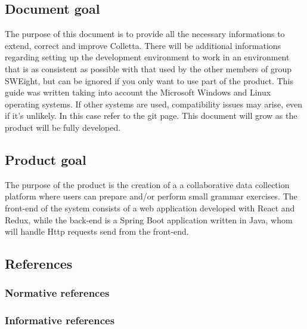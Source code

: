 \subsection{Document goal}
The purpose of this document is to provide all the necessary informations to extend, correct and improve Colletta.
There will be additional informations regarding setting up the development environment to work in an environment that is as consistent as possible with that used
by the other members of group SWEight, but can be ignored if you only want to use part of the product.
This guide was written taking into account the Microsoft Windows and Linux operating systems. If other systems are used, compatibility issues may arise, even if it’s unlikely. In this case refer to the git page. This document will grow as the product will be fully
developed.

\subsection{Product goal}
The purpose of the product is the creation of a a collaborative data collection platform where users can prepare and/or perform small grammar exercises. 
The front-end of the system consists of a web application developed with React and Redux, while the back-end is a Spring Boot application written in Java, whom will handle Http requests send from the front-end. 

\subsection{References}


\subsubsection{Normative references}


\subsubsection{Informative references}
